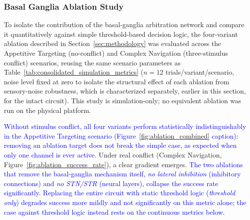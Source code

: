 \documentclass[preprint,12pt]{elsarticle}
\newcommand{\revblue}[1]{\textcolor{blue}{#1}}
\begin{document}
\FloatBarrier

\subsubsection{Basal Ganglia Ablation Study}

To isolate the contribution of the basal-ganglia arbitration network and compare it quantitatively against simple threshold-based decision logic, the four-variant ablation described in Section~\ref{sec:methodology} was evaluated across the Appetitive Targeting (no-conflict) and Complex Navigation (three-stimulus conflict) scenarios, reusing the same scenario parameters as Table~\ref{tab:consolidated_simulation_metrics} ($n=12$ trials/variant/scenario, noise level fixed at zero to isolate the structural effect of each ablation from sensory-noise robustness, which is characterized separately, earlier in this section, for the intact circuit). This study is simulation-only; no equivalent ablation was run on the physical platform.

\revblue{Without stimulus conflict, all four variants perform statistically indistinguishably in the Appetitive Targeting scenario (Figure~\ref{fig:ablation_combined} caption): removing an ablation target does not break the simple case, as expected when only one channel is ever active.} Under real conflict (Complex Navigation, Figure~\ref{fig:ablation_success_rate}), a clear gradient emerges. \revblue{The two ablations that remove the basal-ganglia mechanism itself, \emph{no lateral inhibition} (inhibitory connections) and \emph{no STN/STR} (neural layers), collapse the success rate significantly. Replacing the entire circuit with static threshold logic (\emph{threshold only}) degrades success more mildly and not significantly on this metric alone; the case against threshold logic instead rests on the continuous metrics below.}
\end{document}
